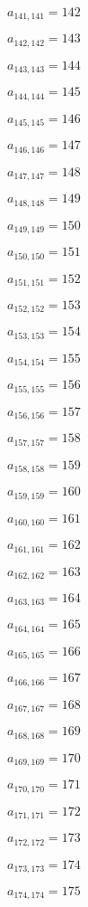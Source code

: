 \documentclass[a4paper,12pt]{article}
\begin{document}
$a _{ 141, 141 } = 142$

$a _{ 142, 142 } = 143$

$a _{ 143, 143 } = 144$

$a _{ 144, 144 } = 145$

$a _{ 145, 145 } = 146$

$a _{ 146, 146 } = 147$

$a _{ 147, 147 } = 148$

$a _{ 148, 148 } = 149$

$a _{ 149, 149 } = 150$

$a _{ 150, 150 } = 151$

$a _{ 151, 151 } = 152$

$a _{ 152, 152 } = 153$

$a _{ 153, 153 } = 154$

$a _{ 154, 154 } = 155$

$a _{ 155, 155 } = 156$

$a _{ 156, 156 } = 157$

$a _{ 157, 157 } = 158$

$a _{ 158, 158 } = 159$

$a _{ 159, 159 } = 160$

$a _{ 160, 160 } = 161$

$a _{ 161, 161 } = 162$

$a _{ 162, 162 } = 163$

$a _{ 163, 163 } = 164$

$a _{ 164, 164 } = 165$

$a _{ 165, 165 } = 166$

$a _{ 166, 166 } = 167$

$a _{ 167, 167 } = 168$

$a _{ 168, 168 } = 169$

$a _{ 169, 169 } = 170$

$a _{ 170, 170 } = 171$

$a _{ 171, 171 } = 172$

$a _{ 172, 172 } = 173$

$a _{ 173, 173 } = 174$

$a _{ 174, 174 } = 175$
\end{document}
